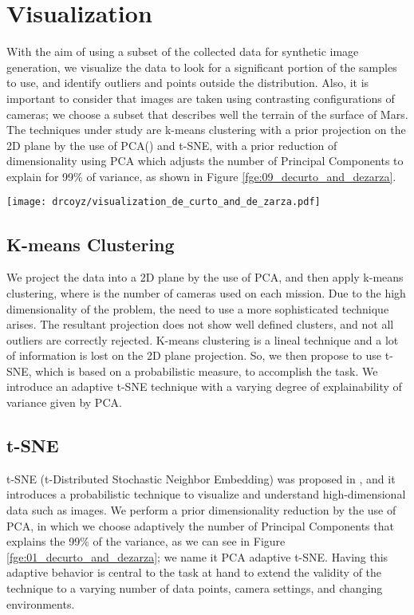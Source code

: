 \documentclass[lettersize,journal]{IEEEtran}
\begin{document}
\section{Visualization}
\label{sn:tsne}
With the aim of using a subset of the collected data for synthetic image generation, we visualize the data to look for a significant portion of the samples to use, and identify outliers and points outside the distribution. Also, it is important to consider that images are taken using contrasting configurations of cameras; we choose a subset that describes well the terrain of the surface of Mars. The techniques under study are k-means clustering with a prior projection on the 2D plane by the use of PCA() and t-SNE, with a prior reduction of dimensionality using PCA which adjusts the number of Principal Components to explain for 99\% of variance, as shown in Figure \ref{fge:09_decurto_and_dezarza}.


\begin{figure*}[ht]
\centering
\texttt{[image: drcoyz/visualization\_de\_curto\_and\_de\_zarza.pdf]}
\caption{Visualization pipeline under study.}
\label{fge:09_decurto_and_dezarza}
\end{figure*}

\subsection{K-means Clustering}
We project the data into a 2D plane by the use of PCA, and then apply k-means clustering, where  is the number of cameras used on each mission. Due to the high dimensionality of the problem, the need to use a more sophisticated technique arises. The resultant projection does not show well defined clusters, and not all outliers are correctly rejected. K-means clustering is a lineal technique and a lot of information is lost on the 2D plane projection. So, we then propose to use t-SNE, which is based on a probabilistic measure, to accomplish the task. We introduce an adaptive t-SNE technique with a varying degree of explainability of variance given by PCA.

\subsection{t-SNE}
t-SNE (t-Distributed Stochastic Neighbor Embedding) was proposed in \cite{vandermaaten08a}, and it introduces a probabilistic technique to visualize and understand high-dimensional data such as images. We perform a prior dimensionality reduction by the use of PCA, in which we choose adaptively the number of Principal Components that explains the 99\% of the variance, as we can see in Figure \ref{fge:01_decurto_and_dezarza}; we name it PCA adaptive t-SNE. Having this adaptive behavior is central to the task at hand to extend the validity of the technique to a varying number of data points, camera settings, and changing environments.
\end{document}
